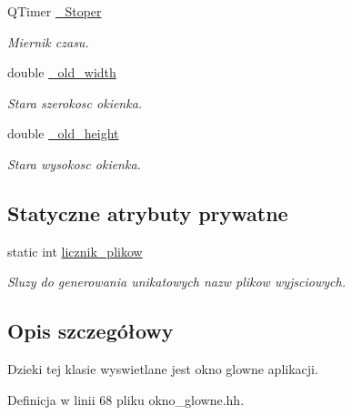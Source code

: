\begin{DoxyCompactItemize}
Q\-Timer \hyperlink{class_okno_glowne_a5d047f90666212f58e69d11af3285d9b}{\-\_\-\-Stoper}
\begin{DoxyCompactList}\small\item\em Miernik czasu. \end{DoxyCompactList}\item 
double \hyperlink{class_okno_glowne_a6a0922607c0970ecdfe8adec7a773c7f}{\-\_\-old\-\_\-width}
\begin{DoxyCompactList}\small\item\em Stara szerokosc okienka. \end{DoxyCompactList}\item 
double \hyperlink{class_okno_glowne_a7dae1b25dbade179eb6dfc30ffeab14b}{\-\_\-old\-\_\-height}
\begin{DoxyCompactList}\small\item\em Stara wysokosc okienka. \end{DoxyCompactList}\end{DoxyCompactItemize}
\subsection*{Statyczne atrybuty prywatne}
\begin{DoxyCompactItemize}
\item 
static int \hyperlink{class_okno_glowne_ae615cbd9c9f9ab06b365c4692ff68729}{licznik\-\_\-plikow}
\begin{DoxyCompactList}\small\item\em Sluzy do generowania unikatowych nazw plikow wyjsciowych. \end{DoxyCompactList}\end{DoxyCompactItemize}


\subsection{Opis szczegółowy}
Dzieki tej klasie wyswietlane jest okno glowne aplikacji. 

Definicja w linii 68 pliku okno\-\_\-glowne.\-hh.



